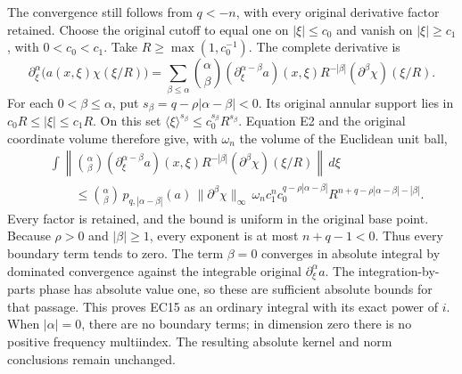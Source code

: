 \documentclass[
  11pt,
]{article}
\begin{document}
The convergence still follows from \(q<-n\), with every original
derivative factor retained. Choose the original cutoff to equal one on
\(|\xi|\leq c_0\) and vanish on \(|\xi|\geq c_1\), with \(0<c_0<c_1\).
Take \(R\geq\max(1,c_0^{-1})\). The complete derivative is \[
 \partial_\xi^\alpha\bigl(a(x,\xi)\chi(\xi/R)\bigr)
 =\sum_{\beta\leq\alpha}{\alpha\choose\beta}
   (\partial_\xi^{\alpha-\beta}a)(x,\xi)
   R^{-|\beta|}(\partial^\beta\chi)(\xi/R).
 \tag{EC16}
\] For each \(0<\beta\leq\alpha\), put
\(s_\beta=q-\rho|\alpha-\beta|<0\). Its original annular support lies in
\(c_0R\leq|\xi|\leq c_1R\). On this set
\(\langle\xi\rangle^{s_\beta}\leq c_0^{s_\beta}R^{s_\beta}\). Equation
E2 and the original coordinate volume therefore give, with \(\omega_n\)
the volume of the Euclidean unit ball, \[
 \begin{split}
 &\int\left\|{\alpha\choose\beta}
       (\partial_\xi^{\alpha-\beta}a)(x,\xi)
       R^{-|\beta|}(\partial^\beta\chi)(\xi/R)\right\|\,d\xi\\
 &\qquad\leq{\alpha\choose\beta}\,
       p_{q,|\alpha-\beta|}(a)\,
       \|\partial^\beta\chi\|_\infty\,
       \omega_nc_1^n c_0^{q-\rho|\alpha-\beta|}
       R^{n+q-\rho|\alpha-\beta|-|\beta|}.
 \end{split}
 \tag{EC17}
\] Every factor is retained, and the bound is uniform in the original
base point. Because \(\rho>0\) and \(|\beta|\geq1\), every exponent is
at most \(n+q-1<0\). Thus every boundary term tends to zero. The term
\(\beta=0\) converges in absolute integral by dominated convergence
against the integrable original \(\partial_\xi^\alpha a\). The
integration-by-parts phase has absolute value one, so these are
sufficient absolute bounds for that passage. This proves EC15 as an
ordinary integral with its exact power of \(i\). When \(|\alpha|=0\),
there are no boundary terms; in dimension zero there is no positive
frequency multiindex. The resulting absolute kernel and norm conclusions
remain unchanged.
\end{document}
